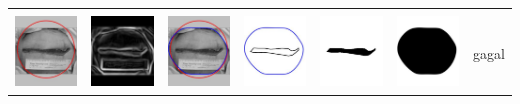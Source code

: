 \begin{table}[H]
\begin{tabular}{|m{0.7in}|m{0.7in}|m{0.7in}|m{0.7in}|m{0.7in}|m{0.7in}|m{0.7in}|}
		&  &  & & & &  \\
		\includegraphics[width=0.7in]{dataset/dataset_3/luka_merah/ready/35_interp_init.jpg}&
		\includegraphics[width=0.7in]{dataset/dataset_3/luka_merah/ready/35_interp_ext.jpg}&
		\includegraphics[width=0.7in]{dataset/dataset_3/luka_merah/ready/35_interp_result.jpg}&
		\includegraphics[width=0.7in]{dataset/dataset_3/luka_merah/ready/35_gt_r.jpg}&
		\includegraphics[width=0.7in]{dataset/dataset_3/luka_merah/ready/35_r.jpg}&
		\includegraphics[width=0.7in]{dataset/dataset_3/luka_merah/ready/35_interp_r.jpg}&
		gagal\\
		\hline
		

\end{tabular}
\end{table}
